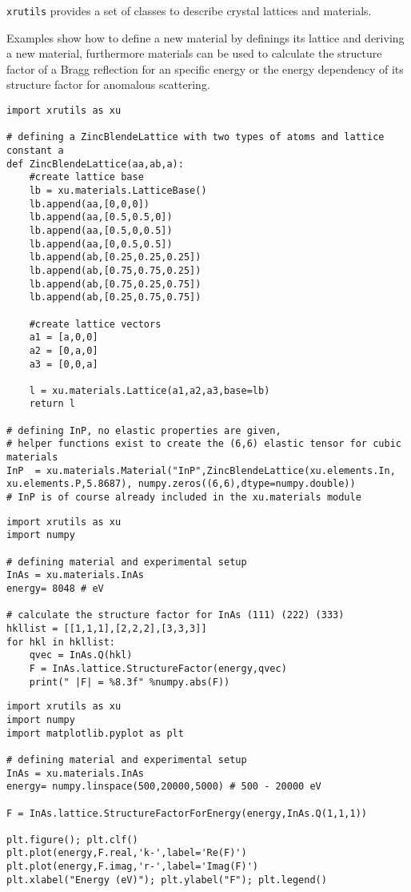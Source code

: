 
{\tt xrutils} provides a set of classes to describe crystal lattices and 
materials.

Examples show how to define a new material by definings its lattice and deriving a new material, furthermore materials can be used to calculate the structure factor of a Bragg reflection for an specific energy or the energy dependency of its structure factor for anomalous scattering.

\begin{lstlisting}[caption=defining a new material from scratch. This consists of an lattice with base and the type of atoms with elastic constantsof the material.]
import xrutils as xu

# defining a ZincBlendeLattice with two types of atoms and lattice constant a
def ZincBlendeLattice(aa,ab,a):
    #create lattice base
    lb = xu.materials.LatticeBase()
    lb.append(aa,[0,0,0])
    lb.append(aa,[0.5,0.5,0])
    lb.append(aa,[0.5,0,0.5])
    lb.append(aa,[0,0.5,0.5])
    lb.append(ab,[0.25,0.25,0.25])
    lb.append(ab,[0.75,0.75,0.25])
    lb.append(ab,[0.75,0.25,0.75])
    lb.append(ab,[0.25,0.75,0.75])
    
    #create lattice vectors
    a1 = [a,0,0]
    a2 = [0,a,0]
    a3 = [0,0,a]
    
    l = xu.materials.Lattice(a1,a2,a3,base=lb)    
    return l

# defining InP, no elastic properties are given, 
# helper functions exist to create the (6,6) elastic tensor for cubic materials 
InP  = xu.materials.Material("InP",ZincBlendeLattice(xu.elements.In, xu.elements.P,5.8687), numpy.zeros((6,6),dtype=numpy.double))
# InP is of course already included in the xu.materials module
\end{lstlisting}

\begin{lstlisting}[caption=calculation of the reflection strength of a Bragg reflection]
import xrutils as xu
import numpy

# defining material and experimental setup
InAs = xu.materials.InAs
energy= 8048 # eV

# calculate the structure factor for InAs (111) (222) (333)
hkllist = [[1,1,1],[2,2,2],[3,3,3]]
for hkl in hkllist:
    qvec = InAs.Q(hkl)
    F = InAs.lattice.StructureFactor(energy,qvec)
    print(" |F| = %8.3f" %numpy.abs(F))
\end{lstlisting}

\begin{lstlisting}[caption=energy dependency of the structure factor]
import xrutils as xu
import numpy
import matplotlib.pyplot as plt

# defining material and experimental setup
InAs = xu.materials.InAs
energy= numpy.linspace(500,20000,5000) # 500 - 20000 eV

F = InAs.lattice.StructureFactorForEnergy(energy,InAs.Q(1,1,1))

plt.figure(); plt.clf()
plt.plot(energy,F.real,'k-',label='Re(F)')
plt.plot(energy,F.imag,'r-',label='Imag(F)')
plt.xlabel("Energy (eV)"); plt.ylabel("F"); plt.legend()
\end{lstlisting}

